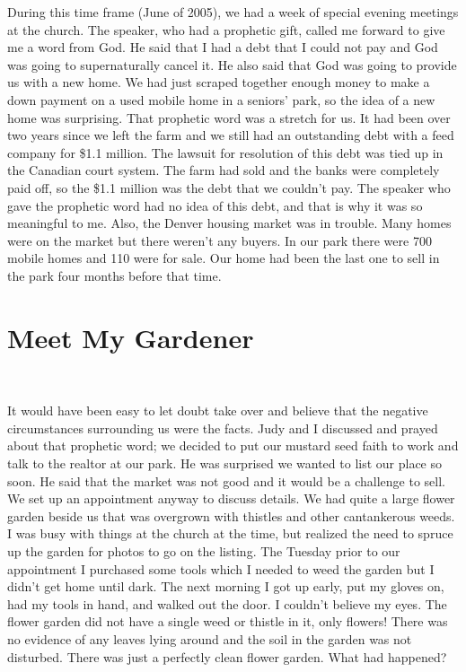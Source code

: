 \documentclass[twoside, 12pt]{book}
\begin{document}
During this time frame (June of 2005), we had a week of special evening meetings at the church. The speaker, who had a prophetic gift, called me forward to give me a word from God. He said that I had a debt that I could not pay and God was going to supernaturally cancel it. He also said that God was going to provide us with a new home. We had just scraped together enough money to make a down payment on a used mobile home in a seniors’ park, so the idea of a new home was surprising. That prophetic word was a stretch for us. It had been over two years since we left the farm and we still had an outstanding debt with a feed company for \$1.1 million. The lawsuit for resolution of this debt was tied up in the Canadian court system. The farm had sold and the banks were completely paid off, so the \$1.1 million was the debt that we couldn’t pay. The speaker who gave the prophetic word had no idea of this debt, and that is why it was so meaningful to me. Also, the Denver housing market was in trouble. Many homes were on the market but there weren’t any buyers. In our park there were 700 mobile homes and 110 were for sale. Our home had been the last one to sell in the park four months before that time.

\clearpage

\section{Meet My Gardener}
\
\thispagestyle{emptyhead}

It would have been easy to let doubt take over and believe that the negative circumstances   surrounding us were the facts. Judy and I discussed and prayed about that prophetic word; we decided to put our mustard seed faith to work and talk to the realtor at our park. He was surprised we wanted to list our place so soon. He said that the market was not good and it would be a challenge to sell. We set up an appointment anyway to discuss details.
We had quite a large flower garden beside us that was overgrown with thistles and other cantankerous weeds. I was busy with things at the church at the time, but realized the need to spruce up the garden for photos to go on the listing. The Tuesday prior to our appointment I purchased some tools which I needed to weed the garden but I didn’t get home until dark. The next morning I got up early, put my gloves on, had my tools in hand, and walked out the door. I couldn’t believe my eyes. The flower garden did not have a single weed or thistle in it, only flowers! There was no evidence of any leaves lying around and the soil in the garden was not disturbed. There was just a perfectly clean flower garden. What had happened?
\end{document}
